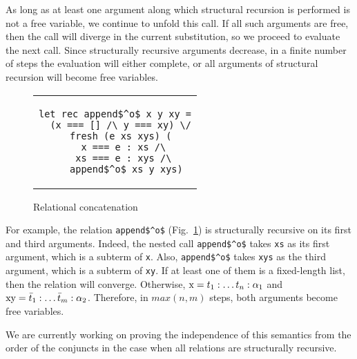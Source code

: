 
As long as at least one argument along which structural recursion is performed is not a free variable, we continue to unfold this call. If all such arguments are free, then the call
will diverge in the current substitution, so we proceed to evaluate the next call. Since structurally recursive arguments decrease, in a finite number of steps the evaluation will
either complete, or all arguments of structural recursion will become free variables.


\begin{figure}[h!]
\centering
\begin{tabular}{c}
\begin{lstlisting}
let rec append$^o$ x y xy =
  (x === [] /\ y === xy) \/
  fresh (e xs xys) (
    x === e : xs /\ 
    xs === e : xys /\ 
    append$^o$ xs y xys)
\end{lstlisting}
\end{tabular}
\caption{Relational concatenation}
\label{fair:lst-appendo}
\end{figure}

For example, the relation \lstinline{append$^o$} (Fig.~\ref{fair:lst-appendo}) is structurally recursive on its first and third arguments. Indeed, the nested call \lstinline{append$^o$}
takes \lstinline{xs} as its first argument, which is a subterm of \lstinline{x}. Also, \lstinline{append$^o$} takes \lstinline{xys} as the third argument, which is a subterm of
\lstinline{xy}. If at least one of them is a fixed-length list, then the relation will converge. Otherwise, $\mbox{\lstinline{x}} = t_1 : \ldots t_n : \alpha_1$
and $\mbox{\lstinline{xy}} = \bar{t}_1 : \ldots \bar{t}_m : \alpha_2$. Therefore, in $max(n, m)$ steps, both arguments become free variables.

We are currently working on proving the independence of this semantics from the order of the conjuncts in the case when all relations are structurally recursive.
